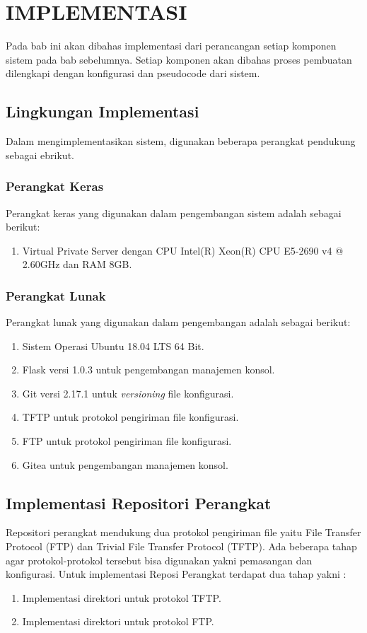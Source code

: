 \chapter{IMPLEMENTASI}
	Pada bab ini akan dibahas implementasi dari perancangan setiap komponen sistem pada bab sebelumnya. Setiap komponen akan dibahas proses pembuatan dilengkapi dengan konfigurasi dan pseudocode dari sistem.
	\section{Lingkungan Implementasi}
       Dalam mengimplementasikan sistem, digunakan beberapa perangkat pendukung sebagai ebrikut.
       \subsection{Perangkat Keras}
        	Perangkat keras yang digunakan dalam pengembangan sistem adalah sebagai berikut:
        	\begin{enumerate}
        		\item Virtual Private Server dengan CPU Intel(R) Xeon(R) CPU E5-2690 v4 @ 2.60GHz dan RAM 8GB.
        	\end{enumerate}
            
       \subsection{Perangkat Lunak}
    	    Perangkat lunak yang digunakan dalam pengembangan adalah sebagai berikut:
    	    \begin{enumerate}
    	    	\item Sistem Operasi Ubuntu 18.04 LTS 64 Bit.
    	    	\item Flask versi 1.0.3 untuk pengembangan manajemen konsol.
    	    	\item Git versi 2.17.1 untuk \textit{versioning} file konfigurasi.
    	    	\item TFTP untuk protokol pengiriman file konfigurasi.
    	    	\item FTP untuk protokol pengiriman file konfigurasi.
    	    	\item Gitea untuk pengembangan manajemen konsol. 
    	    	
    	    \end{enumerate}
       
    \section{Implementasi Repositori Perangkat}
    	Repositori perangkat mendukung dua protokol pengiriman file yaitu File Transfer Protocol (FTP) dan Trivial File Transfer Protocol (TFTP). Ada beberapa tahap agar protokol-protokol tersebut bisa digunakan yakni pemasangan dan konfigurasi. Untuk implementasi Reposi Perangkat terdapat dua tahap yakni :
    	\begin{enumerate}
    		\item Implementasi direktori untuk protokol TFTP.
    		\item Implementasi direktori untuk protokol FTP.
    	\end{enumerate}
